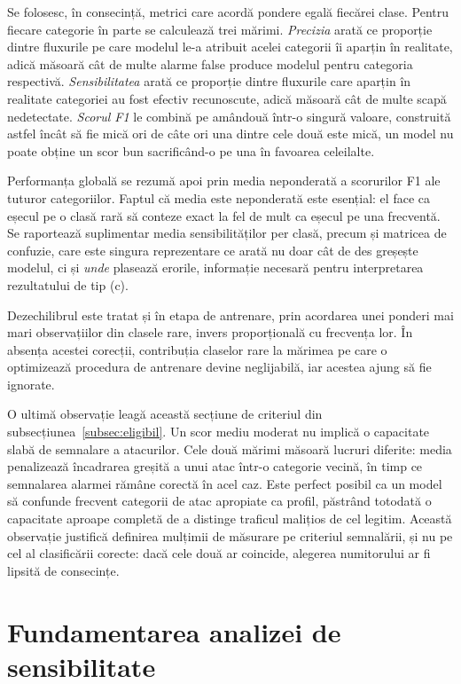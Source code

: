 Se folosesc, în consecință, metrici care acordă pondere egală fiecărei clase. Pentru fiecare categorie în parte se calculează trei mărimi. \emph{Precizia} arată ce proporție dintre fluxurile pe care modelul le-a atribuit acelei categorii îi aparțin în realitate, adică măsoară cât de multe alarme false produce modelul pentru categoria respectivă. \emph{Sensibilitatea} arată ce proporție dintre fluxurile care aparțin în realitate categoriei au fost efectiv recunoscute, adică măsoară cât de multe scapă nedetectate. \emph{Scorul F1} le combină pe amândouă într-o singură valoare, construită astfel încât să fie mică ori de câte ori una dintre cele două este mică, un model nu poate obține un scor bun sacrificând-o pe una în favoarea celeilalte.

Performanța globală se rezumă apoi prin media neponderată a scorurilor F1 ale tuturor categoriilor. Faptul că media este neponderată este esențial: el face ca eșecul pe o clasă rară să conteze exact la fel de mult ca eșecul pe una frecventă. Se raportează suplimentar media sensibilităților per clasă, precum și matricea de confuzie, care este singura reprezentare ce arată nu doar cât de des greșește modelul, ci și \emph{unde} plasează erorile, informație necesară pentru interpretarea rezultatului de tip (c).

Dezechilibrul este tratat și în etapa de antrenare, prin acordarea unei ponderi mai mari observațiilor din clasele rare, invers proporțională cu frecvența lor. În absența acestei corecții, contribuția claselor rare la mărimea pe care o optimizează procedura de antrenare devine neglijabilă, iar acestea ajung să fie ignorate.

O ultimă observație leagă această secțiune de criteriul din subsecțiunea~\ref{subsec:eligibil}. Un scor mediu moderat nu implică o capacitate slabă de semnalare a atacurilor. Cele două mărimi măsoară lucruri diferite: media penalizează încadrarea greșită a unui atac într-o categorie vecină, în timp ce semnalarea alarmei rămâne corectă în acel caz. Este perfect posibil ca un model să confunde frecvent categorii de atac apropiate ca profil, păstrând totodată o capacitate aproape completă de a distinge traficul malițios de cel legitim. Această observație justifică definirea mulțimii de măsurare pe criteriul semnalării, și nu pe cel al clasificării corecte: dacă cele două ar coincide, alegerea numitorului ar fi lipsită de consecințe.

\section{Fundamentarea analizei de sensibilitate}\label{sec:sensibilitate}

